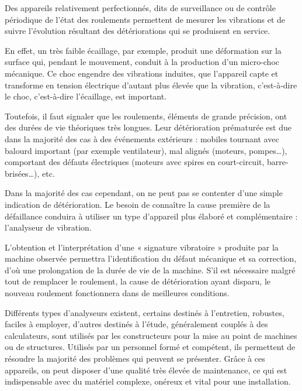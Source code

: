 Des appareils relativement perfectionnés, dits de surveillance ou de contrôle périodique de l’état des roulements permettent de mesurer les vibrations et de suivre l’évolution résultant des détériorations qui se produisent en service. 
\vspace{0.3cm}

En effet, un très faible écaillage, par exemple, produit une déformation sur la surface qui, pendant le mouvement, conduit à la production d’un micro-choc mécanique. Ce choc engendre des vibrations induites, que l’appareil capte et transforme en tension électrique d’autant plus élevée que la vibration, c’est-à-dire le choc, c’est-à-dire l’écaillage, est important.
\vspace{0.3cm}

Toutefois, il faut signaler que les roulements, éléments de grande précision, ont des durées de vie théoriques très longues. Leur détérioration prématurée est due dans la majorité des cas à des événements extérieurs : mobiles tournant avec balourd important (par exemple ventilateur), mal alignés (moteurs, pompes…), comportant des défauts électriques (moteurs avec spires en court-circuit, barre-brisées…), etc.
\vspace{0.3cm}

Dans la majorité des cas cependant, on ne peut pas se contenter d’une simple indication de détérioration. Le besoin de connaître la cause première de la défaillance conduira à utiliser un type d’appareil plus élaboré et complémentaire : l’analyseur de vibration.
\vspace{0.3cm}

L’obtention et l’interprétation d’une « signature vibratoire » produite par la machine observée permettra l’identification du défaut mécanique et sa correction, d’où une prolongation de la durée de vie de la machine. S’il est nécessaire malgré tout de remplacer le roulement, la cause de détérioration ayant disparu, le nouveau roulement fonctionnera dans de meilleures conditions. 
\vspace{0.3cm}

Différents types d’analyseurs existent, certains destinés à l’entretien, robustes, faciles à employer, d’autres destinés à l’étude, généralement couplés à des calculateurs, sont utilisés par les constructeurs pour la mise au point de machines ou de structures. Utilisés par un personnel formé et compétent, ils permettent de résoudre la majorité des problèmes qui peuvent se présenter. Grâce à ces appareils, on peut disposer d’une qualité très élevée de maintenance, ce qui est indispensable avec du matériel complexe, onéreux et vital pour une installation. 




